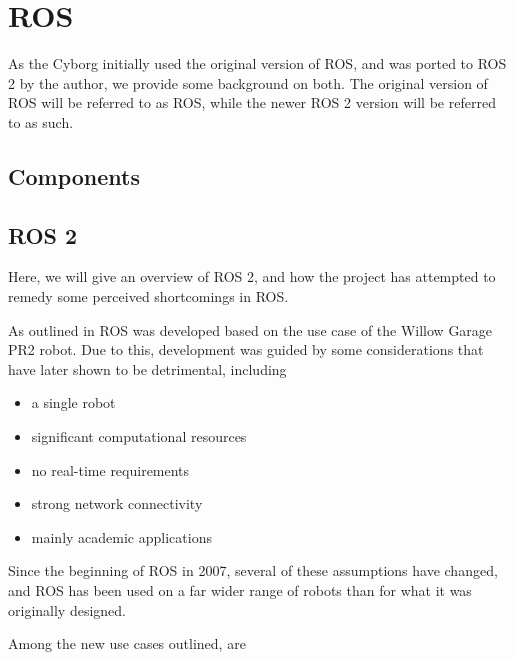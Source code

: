 \documentclass[\rootfolder/main.tex]{subfiles}
\begin{document}
\section{ROS}

As the Cyborg initially used the original version of ROS, and was ported to ROS 2 by the author, we provide some background on both.
The original version of ROS will be referred to as ROS, while the newer ROS 2 version will be referred to as such.

\subsection{Components}

\subsection{ROS 2}

Here, we will give an overview of ROS 2, and how the project has attempted to remedy some perceived shortcomings in ROS.

As outlined in \cite{Gerkey2017} ROS was developed based on the use case of the Willow Garage PR2 robot.
Due to this, development was guided by some considerations that have later shown to be detrimental, including

\begin{itemize}
    \item a single robot
    \item significant computational resources
    \item no real-time requirements
    \item strong network connectivity
    \item mainly academic applications
\end{itemize}

Since the beginning of ROS in 2007, several of these assumptions have changed, and ROS has been used on a far wider range of robots than for what it was originally designed.

Among the new use cases outlined, are
\end{document}
